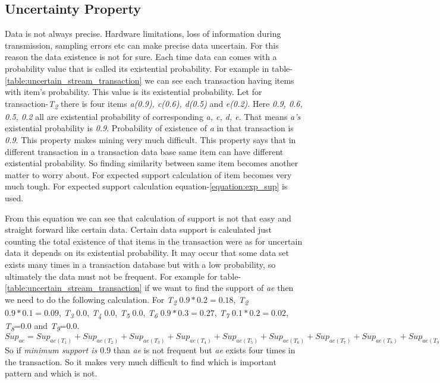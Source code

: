     \subsection{Uncertainty Property}
    Data is not always precise. Hardware limitations, loss of information during transmission, sampling errors etc can make precise data uncertain. For this reason the data existence is not for sure. Each time data can comes with a probability value that is called its existential probability. For example in table-\ref{table:uncertain_stream_transaction}  we can see each transaction having items with item's probability. This value is its existential probability. Let for transaction-\emph{T\textsubscript{2}} there is four items \emph{a(0.9), c(0.6), d(0.5)} and \emph{e(0.2)}. Here \emph{0.9, 0.6, 0.5, 0.2} all are existential probability of corresponding \emph{a, c, d, e}. That means \emph{a's} existential probability is \emph{0.9}. Probability of existence of \emph{a} in that transaction is \emph{0.9}. This property makes mining very much difficult. This property says that in different transaction in a transaction data base same item can have different existential probability. So finding similarity between same item becomes another matter to worry about. For expected support calculation of item becomes very much tough. For expected support calculation equation-\ref{equation:exp_sup} is used.
    
    From this equation we can see that calculation of support is not that easy and straight forward like certain data. Certain data support is calculated just counting the total existence of that items in the transaction were as for uncertain data it depends on its existential probability. It may occur that some data set exists many times in a transaction database but with a low probability, so ultimately the data must not be frequent. For example for table-\ref{table:uncertain_stream_transaction} if we want to find the support of \emph{ae} then we need to do the following calculation. For \emph{T\textsubscript{2}} $0.9*0.2=0.18$, \emph{T\textsubscript{2}} $0.9*0.1=0.09$, \emph{T\textsubscript{3}} $0.0$, \emph{T\textsubscript{4}} $0.0$, \emph{T\textsubscript{5}} $0.0$, \emph{T\textsubscript{6}} $0.9*0.3=0.27$, \emph{T\textsubscript{7}} $0.1*0.2=0.02$, \emph{T\textsubscript{8}}=$0.0$ and \emph{T\textsubscript{9}}=$0.0$.$Sup_{ae} =Sup_{ae(T_1)}+Sup_{ae(T_2)}+Sup_{ae(T_3)}+Sup_{ae(T_4)}+Sup_{ae(T_5)}+Sup_{ae(T_6)}+Sup_{ae(T_7)}+Sup_{ae(T_8)}+Sup_{ae(T_9)}=0.18+0.09+0.0+0.0+0.0+0.27+0.0+0.02+0.0+0.0=0.54$ So if \emph{minimum support is $0.9$} than \emph{ae} is not frequent but \emph{ae} exists four times in the transaction. So it makes very much difficult to find which is important pattern and which is not.
    
